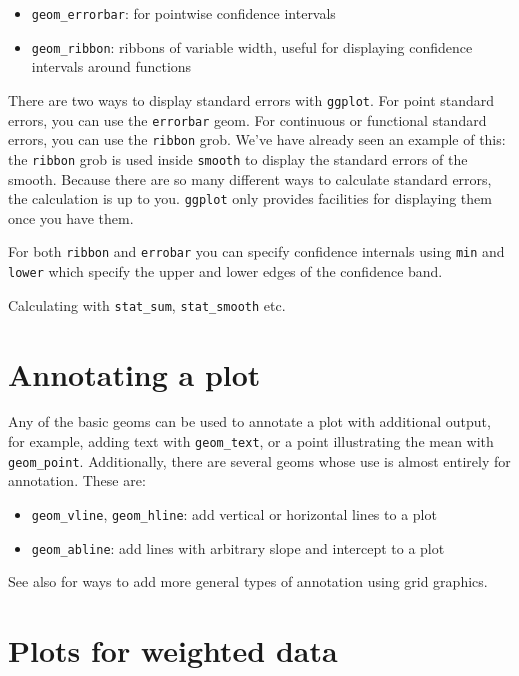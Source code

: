 \begin{itemize}
	\item {\tt geom\_errorbar}: for pointwise confidence intervals
	\item {\tt geom\_ribbon}: ribbons of variable width, useful for displaying confidence intervals around functions
\end{itemize}

There are two ways to display standard errors with {\tt ggplot}.  For point standard errors, you can use the {\tt errorbar} geom.  For continuous or functional standard errors, you can use the {\tt ribbon} grob.  We've have already seen an example of this: the {\tt ribbon} grob is used inside {\tt smooth} to display the standard errors of the smooth.  Because there are so many different ways to calculate standard errors, the calculation is up to you.  {\tt ggplot} only provides facilities for displaying them once you have them.

For both {\tt ribbon} and {\tt errobar} you can specify confidence internals using {\tt min} and {\tt lower} which specify the upper and lower edges of the confidence band.

Calculating with {\tt stat_sum}, {\tt stat_smooth} etc.



\section{Annotating a plot}\label{sub:annotating_a_plot}

Any of the basic geoms can be used to annotate a plot with additional output, for example, adding text with {\tt geom\_text}, or a point illustrating the mean with {\tt geom\_point}.  Additionally, there are several geoms whose use is almost entirely for annotation.  These are:

\begin{itemize}
	\item {\tt geom\_vline}, {\tt geom\_hline}: add vertical or horizontal lines to a plot
	\item {\tt geom\_abline}: add lines with arbitrary slope and intercept to a plot
\end{itemize}

See also  for ways to add more general types of annotation using grid graphics.

\section{Plots for weighted data}\label{sec:weighted_data}

